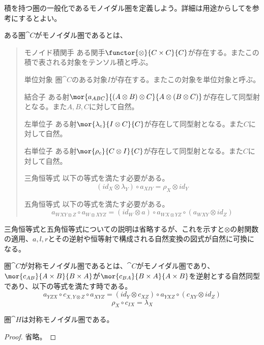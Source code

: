 \documentclass[uplatex,dvipdfmx]{jsarticle}
\begin{document}
  積を持つ圏の一般化であるモノイダル圏を定義しよう。詳細は用途からして\cite{BCECT}を参考にするとよい。
  \begin{define}[モノイダル圏]\label{def-monoidal-cat}
    ある圏$\cat{C}$がモノイダル圏であるとは、
    \begin{quote}
      \begin{mydescription}
        \item[モノイド積関手]
        ある関手$\functor{\otimes}{C\times C}{C}$が存在する。またこの積で表される対象をテンソル積と呼ぶ。
        \item[単位対象]圏$\cat{C}$のある対象$I$が存在する。またこの対象を単位対象と呼ぶ。
        \item[結合子]ある射$\mor{a_{ABC}}{(A\otimes B)\otimes C}{A\otimes(B\otimes C)}$が存在して同型射となる。また$A,B,C$に対して自然。
        \item[左単位子]ある射$\mor{\lambda_c}{I\otimes C}{C}$が存在して同型射となる。また$C$に対して自然。
        \item[右単位子]ある射$\mor{\rho_c}{C\otimes I}{C}$が存在して同型射となる。また$C$に対して自然。
        \item[三角恒等式]以下の等式を満たす必要がある。
        \[(id_X\otimes \lambda_Y)\circ a_{XIY}=\rho_X\otimes id_Y\]
        \item[五角恒等式]以下の等式を満たす必要がある。
        \[a_{WXY\otimes Z}\circ a_{W\otimes XYZ}=(id_W\otimes a)\circ a_{WX\otimes YZ}\circ(a_{WXY}\otimes id_Z) \]
      \end{mydescription}
    \end{quote}
  \end{define}
  三角恒等式と五角恒等式についての説明は省略するが、これを示すと$\otimes$の射関数の適用、$a,l,r$とその逆射や恒等射で構成される自然変換の図式が自然に可換になる。
  \begin{define}[対称モノイダル圏]\label{def-symmetric-monoidal-cat}
    圏$\cat{C}$が対称モノイダル圏であるとは、$\cat{C}$がモノイダル圏であり、$\mor{c_{AB}}{A\times B}{B\times A}$が$\mor{c_{BA}}{B\times A}{A\times B}$を逆射とする自然同型であり、以下の等式を満たす時である。
    \[a_{YZX}\circ c_{X,Y\otimes Z}\circ a_{XYZ}=(id_Y\otimes c_{XZ})\circ a_{YXZ}\circ(c_{XY}\otimes id_Z)\]
    \[\rho_{X}\circ c_{IX} = \lambda_{X}\]
  \end{define}
  \begin{prop}\label{prop-h-is-smc}
    圏$\cat{H}$は対称モノイダル圏である。
  \end{prop}
  \begin{proof}
    省略。
  \end{proof}
  
  
\end{document}
